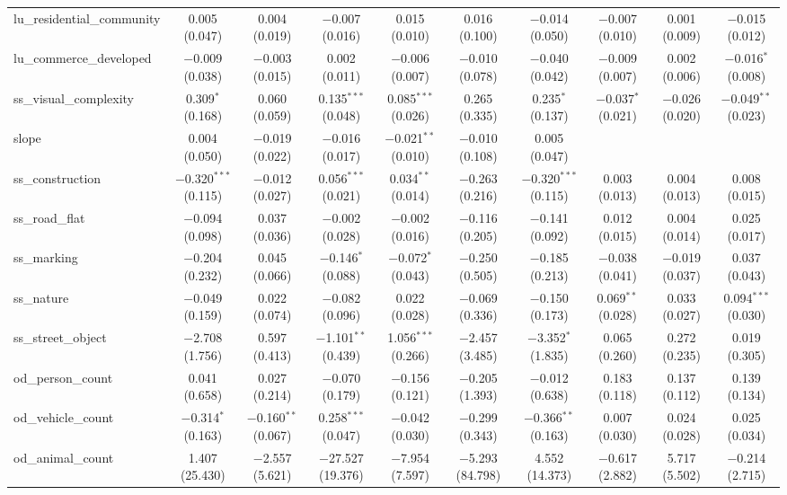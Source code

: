 \begin{table}[!htbp]
\begin{tabular}{@{\extracolsep{1pt}}lccccccccc}
  lu\_residential\_community & 0.005 (0.047) & 0.004 (0.019) & $-$0.007 (0.016) & 0.015 (0.010) & 0.016 (0.100) & $-$0.014 (0.050) & $-$0.007 (0.010) & 0.001 (0.009) & $-$0.015 (0.012) \\ 
  lu\_commerce\_developed & $-$0.009 (0.038) & $-$0.003 (0.015) & 0.002 (0.011) & $-$0.006 (0.007) & $-$0.010 (0.078) & $-$0.040 (0.042) & $-$0.009 (0.007) & 0.002 (0.006) & $-$0.016$^{*}$ (0.008) \\ 
  ss\_visual\_complexity & 0.309$^{*}$ (0.168) & 0.060 (0.059) & 0.135$^{***}$ (0.048) & 0.085$^{***}$ (0.026) & 0.265 (0.335) & 0.235$^{*}$ (0.137) & $-$0.037$^{*}$ (0.021) & $-$0.026 (0.020) & $-$0.049$^{**}$ (0.023) \\ 
  slope & 0.004 (0.050) & $-$0.019 (0.022) & $-$0.016 (0.017) & $-$0.021$^{**}$ (0.010) & $-$0.010 (0.108) & 0.005 (0.047) &  &  &  \\ 
  ss\_construction & $-$0.320$^{***}$ (0.115) & $-$0.012 (0.027) & 0.056$^{***}$ (0.021) & 0.034$^{**}$ (0.014) & $-$0.263 (0.216) & $-$0.320$^{***}$ (0.115) & 0.003 (0.013) & 0.004 (0.013) & 0.008 (0.015) \\ 
  ss\_road\_flat & $-$0.094 (0.098) & 0.037 (0.036) & $-$0.002 (0.028) & $-$0.002 (0.016) & $-$0.116 (0.205) & $-$0.141 (0.092) & 0.012 (0.015) & 0.004 (0.014) & 0.025 (0.017) \\ 
  ss\_marking & $-$0.204 (0.232) & 0.045 (0.066) & $-$0.146$^{*}$ (0.088) & $-$0.072$^{*}$ (0.043) & $-$0.250 (0.505) & $-$0.185 (0.213) & $-$0.038 (0.041) & $-$0.019 (0.037) & 0.037 (0.043) \\ 
  ss\_nature & $-$0.049 (0.159) & 0.022 (0.074) & $-$0.082 (0.096) & 0.022 (0.028) & $-$0.069 (0.336) & $-$0.150 (0.173) & 0.069$^{**}$ (0.028) & 0.033 (0.027) & 0.094$^{***}$ (0.030) \\ 
  ss\_street\_object & $-$2.708 (1.756) & 0.597 (0.413) & $-$1.101$^{**}$ (0.439) & 1.056$^{***}$ (0.266) & $-$2.457 (3.485) & $-$3.352$^{*}$ (1.835) & 0.065 (0.260) & 0.272 (0.235) & 0.019 (0.305) \\ 
  od\_person\_count & 0.041 (0.658) & 0.027 (0.214) & $-$0.070 (0.179) & $-$0.156 (0.121) & $-$0.205 (1.393) & $-$0.012 (0.638) & 0.183 (0.118) & 0.137 (0.112) & 0.139 (0.134) \\ 
  od\_vehicle\_count & $-$0.314$^{*}$ (0.163) & $-$0.160$^{**}$ (0.067) & 0.258$^{***}$ (0.047) & $-$0.042 (0.030) & $-$0.299 (0.343) & $-$0.366$^{**}$ (0.163) & 0.007 (0.030) & 0.024 (0.028) & 0.025 (0.034) \\ 
  od\_animal\_count & 1.407 (25.430) & $-$2.557 (5.621) & $-$27.527 (19.376) & $-$7.954 (7.597) & $-$5.293 (84.798) & 4.552 (14.373) & $-$0.617 (2.882) & 5.717 (5.502) & $-$0.214 (2.715) \\ 

\end{tabular}
\end{table}

